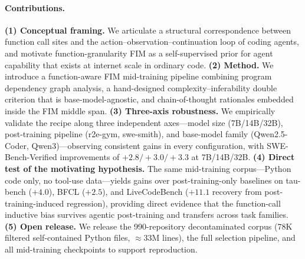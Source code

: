 \paragraph{Contributions.}
\textbf{(1) Conceptual framing.} We articulate a structural correspondence
between function call sites and the action--observation--continuation loop
of coding agents, and motivate function-granularity FIM as a self-supervised
prior for agent capability that exists at internet scale in ordinary code.
\textbf{(2) Method.} We introduce a function-aware FIM mid-training pipeline
combining program dependency graph analysis, a hand-designed
complexity--inferability double criterion that is base-model-agnostic, and
chain-of-thought rationales embedded inside the FIM middle span.
\textbf{(3) Three-axis robustness.} We empirically validate the recipe along
three independent axes---model size (7B/14B/32B), post-training pipeline
(r2e-gym, swe-smith), and base-model family (Qwen2.5-Coder,
Qwen3)---observing consistent gains in every configuration, with
SWE-Bench-Verified improvements of $+2.8/+3.0/+3.3$ at 7B/14B/32B.
\textbf{(4) Direct test of the motivating hypothesis.} The same mid-training
corpus---Python code only, no tool-use data---yields gains over
post-training-only baselines on tau-bench ($+4.0$), BFCL ($+2.5$), and
LiveCodeBench ($+11.1$ recovery from post-training-induced regression),
providing direct evidence that the function-call inductive bias survives
agentic post-training and transfers across task families.
\textbf{(5) Open release.} We release the 990-repository decontaminated
corpus (78K filtered self-contained Python files, $\approx 33\mathrm{M}$
lines), the full selection pipeline, and all mid-training checkpoints to
support reproduction.